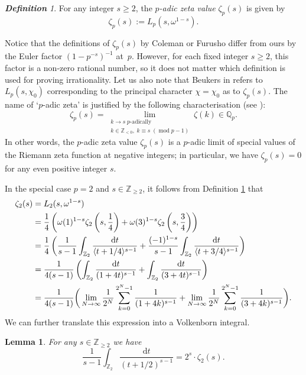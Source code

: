 \documentclass[12pt]{article}
\let\ge\geqslant
\renewcommand{\d}{\mathrm{d}}
\renewcommand\pmod[1]{\;(\operatorname{mod}#1)}
\newtheorem{lemma}[theorem]{Lemma}
\theoremstyle{remark}
\newtheorem{definition}[theorem]{\bf Definition}
\numberwithin{equation}{section}
\begin{document}
\begin{definition}
\label{def zeta_p}
For any integer $s \ge 2$, the \emph{$p$-adic zeta value} $\zeta_p(s)$ is given by
\[ 
\zeta_p(s) := L_p(s,\omega^{1-s}).
\]
\end{definition}

Notice that the definitions of $\zeta_p(s)$ by Coleman \cite{Col1984} or Furusho \cite{Fur2004} differ from ours by the Euler factor $(1-p^{-s})^{-1}$ at~$p$. 
However, for each fixed integer $s\ge2$, this factor is a non-zero rational number, so it does not matter which definition is used for proving irrationality. 
Let us also note that Beukers in \cite{Beu2008} refers to $L_p(s,\chi_0)$ corresponding to the principal character $\chi=\chi_0$ as to $\zeta_p(s)$.
The name of `$p$-adic zeta' is justified by the following characterisation (see \cite[Lemma 2.4]{Cal2005}):
\[
\zeta_p(s) = \lim_{\substack{k\to s \;\text{$p$-adically}\\k \in \mathbb{Z}_{<0}, \; k\equiv s \pmod{p-1}}} \zeta(k) \in \mathbb{Q}_p.
\]
In other words, the $p$-adic zeta value $\zeta_p(s)$ is a $p$-adic limit of special values of the Riemann zeta function at negative integers; in particular, we have $\zeta_p(s)=0$ for any even positive integer $s$.

In the special case $p=2$ and $s \in \mathbb{Z}_{\ge 2}$, it follows from Definition \ref{def zeta_p} that
\begin{align}
\zeta_2(s)
&= L_2(s,\omega^{1-s}) \notag\\ 
&= \frac{1}{4}\left( \omega(1)^{1-s}\zeta_2\left( s,\frac{1}{4}\right) + \omega(3)^{1-s}\zeta_2\left( s,\frac{3}{4}\right) \right) \notag\\
&= \frac{1}{4}\left( \frac{1}{s-1}\int_{\mathbb{Z}_2} \frac{\d t}{\langle t+1/4 \rangle^{s-1}} + \frac{(-1)^{1-s}}{s-1}\int_{\mathbb{Z}_2} \frac{\d t}{\langle t+3/4 \rangle^{s-1}} \right) \notag\\
&= \frac{1}{4(s-1)} \left( \int_{\mathbb{Z}_2} \frac{\d t}{(1+4t)^{s-1}} +  \int_{\mathbb{Z}_2} \frac{\d t}{(3+4t)^{s-1}}  \right) \notag\\
&= \frac{1}{4(s-1)} \bigg( \lim_{N \to \infty}  \frac{1}{2^N} \sum_{k=0}^{2^N -1} \frac{1}{(1+4k)^{s-1}} + \lim_{N \to \infty}  \frac{1}{2^N} \sum_{k=0}^{2^N -1} \frac{1}{(3+4k)^{s-1}}\bigg).
\label{271}
\end{align}
We can further translate this expression into a Volkenborn integral.

\begin{lemma}
\label{lem_shift_by_1/2}
For any $s \in \mathbb{Z}_{\ge 2}$ we have
\[  
\frac{1}{s-1}\int_{\mathbb{Z}_2} \frac{\d t}{(t+1/2)^{s-1}} = 2^{s} \cdot \zeta_2(s).
 \]
\end{lemma}
\end{document}
